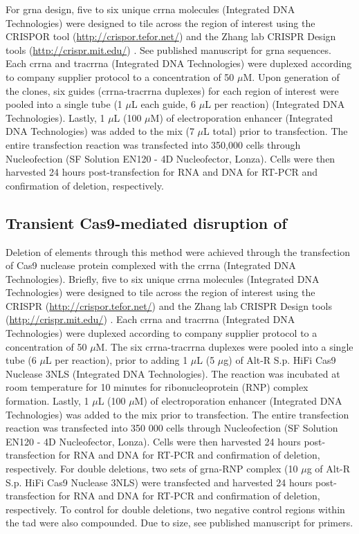 For \gls{grna} design, five to six unique \gls{crrna} molecules (Integrated DNA Technologies) were designed to tile across the region of interest using the CRISPOR tool (\url{http://crispor.tefor.net/}) \cite{haeusslerEvaluationOfftargetOntarget2016} and the Zhang lab CRISPR Design tools (\url{http://crispr.mit.edu/}) \cite{hsuDNATargetingSpecificity2013}.
See published manuscript for \gls{grna} sequences.
Each \gls{crrna} and \gls{tracrrna} (Integrated DNA Technologies) were duplexed according to company supplier protocol to a concentration of 50 $\mu$M.
Upon generation of the clones, six guides (\gls{crrna}-\gls{tracrrna} duplexes) for each region of interest were pooled into a single tube (1 $\mu$L each guide, 6 $\mu$L per reaction) (Integrated DNA Technologies).
Lastly, 1 $\mu$L (100 $\mu$M) of electroporation enhancer (Integrated DNA Technologies) was added to the mix (7 $\mu$L total) prior to transfection.
The entire transfection reaction was transfected into 350,000 cells through Nucleofection (SF Solution EN120 - 4D Nucleofector, Lonza).
Cells were then harvested 24 hours post-transfection for RNA and DNA for RT-PCR and confirmation of deletion, respectively.

\subsection{Transient Cas9-mediated disruption of }

Deletion of elements through this method were achieved through the transfection of Cas9 nuclease protein complexed with the \gls{crrna} (Integrated DNA Technologies).
Briefly, five to six unique \gls{crrna} molecules (Integrated DNA Technologies) were designed to tile across the region of interest using the CRISPR (\url{http://crispor.tefor.net/}) \cite{haeusslerEvaluationOfftargetOntarget2016} and the Zhang lab CRISPR Design tools (\url{http://crispr.mit.edu/}) \cite{hsuDNATargetingSpecificity2013}.
Each \gls{crrna} and \gls{tracrrna} (Integrated DNA Technologies) were duplexed according to company supplier protocol to a concentration of 50 $\mu$M.
The six \gls{crrna}-\gls{tracrrna} duplexes were pooled into a single tube (6 $\mu$L per reaction), prior to adding 1 $\mu$L (5 $\mu$g) of Alt-R S.p. HiFi Cas9 Nuclease 3NLS (Integrated DNA Technologies).
The reaction was incubated at room temperature for 10 minutes for ribonucleoprotein (RNP) complex formation.
Lastly, 1 $\mu$L (100 $\mu$M) of electroporation enhancer (Integrated DNA Technologies) was added to the mix prior to transfection.
The entire transfection reaction was transfected into 350 000 cells through Nucleofection (SF Solution EN120 - 4D Nucleofector, Lonza).
Cells were then harvested 24 hours post-transfection for RNA and DNA for RT-PCR and confirmation of deletion, respectively.
For double deletions, two sets of \gls{grna}-RNP complex (10 $\mu$g of Alt-R S.p. HiFi Cas9 Nuclease 3NLS) were transfected and harvested 24 hours post-transfection for RNA and DNA for RT-PCR and confirmation of deletion, respectively.
To control for double deletions, two negative control regions within the \gls{tad} were also compounded.
Due to size, see published manuscript for primers.

